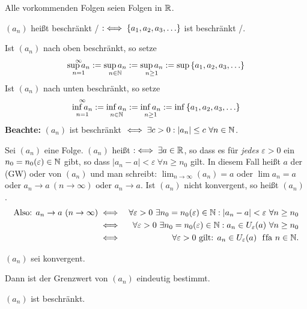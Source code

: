 \documentclass[a4paper,twoside,DIV15,BCOR12mm]{scrbook}
\begin{document}
\begin{vereinbarung}
Alle vorkommenden Folgen seien Folgen in $\mathbb{R}$.
\end{vereinbarung}

\begin{definition}
$(a_n)$ heißt beschränkt / $:\iff \{a_1,a_2,a_3,\ldots\}$ ist beschränkt /.

Ist $(a_n)$ nach oben beschränkt, so setze
$$ \mathop{\sup{a_n}}_{n=1}^{\infty} := \mathop{\sup{a_n}}_{n\in \mathbb{N}} := \mathop{\sup{a_n}}_{n \ge 1} := \sup{\{a_1,a_2,a_3,\ldots\}}$$
Ist $(a_n)$ nach unten beschränkt, so setze
$$ \mathop{\inf{a_n}}_{n=1}^{\infty} := \mathop{\inf{a_n}}_{n\in \mathbb{N}} := \mathop{\inf{a_n}}_{n \ge 1} := \inf{\{a_1,a_2,a_3,\ldots\}}$$
\textbf{Beachte:} $(a_n)$ ist beschränkt $\iff \exists c > 0 : |a_n| \le c \ \forall n \in \mathbb{N}$.
\end{definition}

\begin{definition}
Sei $(a_n)$ eine Folge. $(a_n)$ heißt  $:\iff \exists a \in \mathbb{R}$, so dass es für \textit{jedes} $\varepsilon > 0$ ein $n_0 = n_0(\varepsilon) \in \mathbb{N}$ gibt, so dass $|a_n - a| < \varepsilon \ \forall n \ge n_0$ gilt. In diesem Fall heißt $a$ der  (GW) oder  von $(a_n)$ und man schreibt: $\lim_{n \to \infty}(a_n) = a$ oder $\lim{a_n} = a$ oder $a_n \to a \ (n \to \infty)$ oder $a_n \to a$. Ist $(a_n)$ nicht konvergent, so heißt $(a_n)$ .
\begin{eqnarray*}
\text{Also: } a_n \to a \ (n \to \infty) 
  &\iff& \forall\varepsilon > 0 \ \exists n_0 = n_0(\varepsilon) \in\mathbb{N}: |a_n - a| < \varepsilon \ \forall n \ge n_0 \\
  &\iff& \forall\varepsilon > 0 \ \exists n_0 = n_0(\varepsilon) \in\mathbb{N}: a_n \in U_{\varepsilon}(a)\ \forall n \ge n_0 \\
  &\iff& \forall\varepsilon > 0 \text{ gilt: } a_n \in U_\varepsilon(a) \text{ \text{ f\/fa }} n \in \mathbb{N}.
\end{eqnarray*}
\end{definition}

\begin{satz}
$(a_n)$ sei konvergent.
\begin{liste}
\item Dann ist der Grenzwert von $(a_n)$ eindeutig bestimmt.
\item $(a_n)$ ist beschränkt.
\end{liste}
\end{satz}
\end{document}

